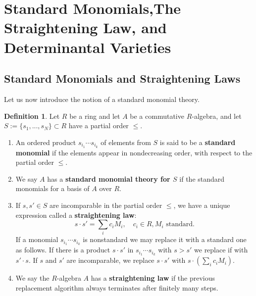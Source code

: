 \documentclass[11pt,oneside]{amsbook}
\numberwithin{equation}{section}
\theoremstyle{plain}
\theoremstyle{definition}
\newtheorem{defn}[theorem]{Definition}
\theoremstyle{remark}
\begin{document}
		
		\section{Standard Monomials,The Straightening Law, and Determinantal Varieties}\label{Straightening Law 1}
		
		\subsection{Standard Monomials and Straightening Laws}\label{monomial orders}
		Let us now introduce the notion of a standard monomial theory. 
		
		\begin{defn}
			Let $R$ be a ring and let $A$ be a commutative $R$-algebra, and let $S:=\{s_1, ..., s_N\} \subset R$ have a partial order $\leq$. 
			\begin{enumerate}
				\item An ordered product $s_{i_1} \cdots s_{i_k}$ of elements from $S$ is said to be a \textbf{standard monomial} if the elements appear in nondecreasing order, with respect to the partial order $\leq$. 
				\item We say $A$ has a \textbf{standard monomial theory for $S$} if the standard monomials for a basis of $A$ over $R$.
				\item If $s, s' \in S$ are incomparable in the partial order $\leq$, we have a unique expression called a \textbf{straightening law}:
				\[ s \cdot s' = \sum_i c_iM_i, \quad c_i \in R, M_i \text{ standard}. \]
				If a monomial $s_{i_1} \cdots s_{i_k}$ is nonstandard we may replace it with a standard one as follows. If there is a product $s \cdot s'$ in $s_{i_1} \cdots s_{i_k}$ with $s > s'$ we replace if with $s' \cdot s$. If $s$ and $s'$ are incomparable, we replace $s \cdot s'$ with $s \cdot \left(\sum_i c_iM_i\right)$. 
				\item We say the $R$-algebra $A$ has a \textbf{straightening law} if the previous replacement algorithm always terminates after finitely many steps. 
			\end{enumerate}
		\end{defn}
		
\end{document}
